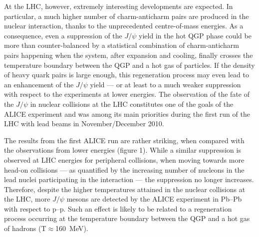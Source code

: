At the LHC, however, extremely interesting developments are expected. In particular, a much higher number of charm-anticharm pairs are produced in the nuclear interaction, thanks to the unprecedented centre-of-mass energies. As a consequence, even a suppression of the $J/\psi$ yield in the hot QGP phase could be more than counter-balanced by a statistical combination of charm-anticharm pairs happening when the system, after expansion and cooling, finally crosses the temperature boundary between the QGP and a hot gas of particles. If the density of heavy quark pairs is large enough, this regeneration process may even lead to an enhancement of the $J/\psi$ yield --- or at least to a much weaker suppression with respect to the experiments at lower energies. The observation of the fate of the $J/\psi$ in nuclear collisions at the LHC constitutes one of the goals of the ALICE experiment and was among its main priorities during the first run of the LHC with lead beams in November/December 2010.

The results from the first ALICE run are rather striking, when compared with the observations from lower energies (figure 1). While a similar suppression is observed at LHC energies for peripheral collisions, when moving towards more head-on collisions --- as quantified by the increasing number of nucleons in the lead nuclei participating in the interaction --- the suppression no longer increases. Therefore, despite the higher temperatures attained in the nuclear collisions at the LHC, more $J/\psi$ mesons are detected by the ALICE experiment in Pb--Pb with respect to p--p. Such an effect is likely to be related to a regeneration process occurring at the temperature boundary between the QGP and a hot gas of hadrons (T$\approx$160~MeV).
